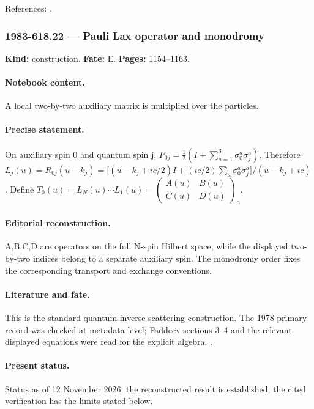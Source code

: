 \noindent References: \citep{yang1967manybody,faddeev1996bethe}.\par

\subsubsection{1983-618.22 --- Pauli Lax operator and monodromy}

\label{item:1983-618.22}

\noindent\textbf{Kind:} construction. \textbf{Fate:} E. \textbf{Pages:} 1154--1163.\par

\paragraph{Notebook content.} A local two-by-two auxiliary matrix is multiplied over the particles.

\paragraph{Precise statement.} On auxiliary spin 0 and quantum spin j, $P_{0j}=\tfrac12(I+\sum_{a=1}^3\sigma_0^a\sigma_j^a)$. Therefore $L_j(u)=R_{0j}(u-k_j)=\bigl[(u-k_j+ic/2)I+(ic/2)\sum_a\sigma_0^a\sigma_j^a\bigr]/(u-k_j+ic)$. Define $T_0(u)=L_N(u)\cdots L_1(u)=\begin{pmatrix}A(u)&B(u)\\ C(u)&D(u)\end{pmatrix}_0$.

\paragraph{Editorial reconstruction.} A,B,C,D are operators on the full N-spin Hilbert space, while the displayed two-by-two indices belong to a separate auxiliary spin. The monodromy order fixes the corresponding transport and exchange conventions.

\paragraph{Literature and fate.} This is the standard quantum inverse-scattering construction. The 1978 primary record was checked at metadata level; Faddeev sections 3--4 and the relevant displayed equations were read for the explicit algebra. \citep{sklyaninfaddeev1978quantum,faddeev1996bethe}.

\paragraph{Present status.} Status as of 12 November 2026: the reconstructed result is established; the cited verification has the limits stated below.

